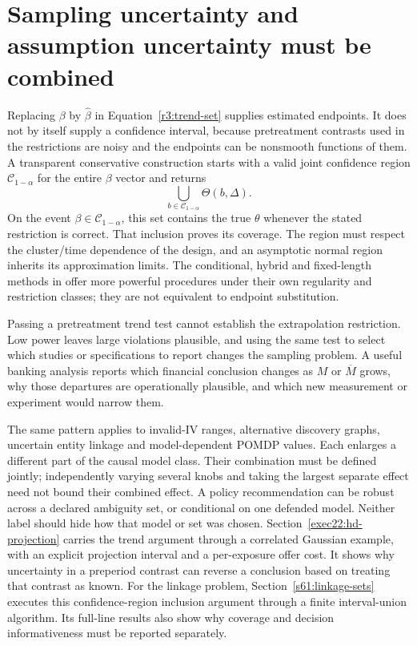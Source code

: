 \section{Sampling uncertainty and assumption uncertainty must be combined}
\label{r3:sensitivity-inference}
Replacing $\beta$ by $\widehat\beta$ in
Equation~\eqref{r3:trend-set} supplies estimated endpoints. It does
not by itself supply a confidence interval, because pretreatment
contrasts used in the restrictions are noisy and the endpoints can
be nonsmooth functions of them. A transparent conservative
construction starts with a valid joint confidence region
$\mathcal C_{1-\alpha}$ for the entire $\beta$ vector and returns
\[
 \bigcup_{b\in\mathcal C_{1-\alpha}}\Theta(b,\Delta).
\]
On the event $\beta\in\mathcal C_{1-\alpha}$, this set contains
the true $\theta$ whenever the stated restriction is correct.
That inclusion proves its coverage. The region must respect the
cluster/time dependence of the design, and an asymptotic normal
region inherits its approximation limits. The conditional,
hybrid and fixed-length methods in
\citet[Sections 3--4]{rambachan2023} offer more powerful procedures
under their own regularity and restriction classes; they are not
equivalent to endpoint substitution.

Passing a pretreatment trend test cannot establish the extrapolation
restriction. Low power leaves large violations plausible, and using
the same test to select which studies or specifications to report
changes the sampling problem. A useful banking analysis reports
which financial conclusion changes as $M$ or $\overline M$ grows,
why those departures are operationally plausible, and which new
measurement or experiment would narrow them.

The same pattern applies to invalid-IV ranges, alternative discovery
graphs, uncertain entity linkage and model-dependent POMDP values.
Each enlarges a different part of the causal model class. Their
combination must be defined jointly; independently varying several
knobs and taking the largest separate effect need not bound their
combined effect. A policy recommendation can be robust across a
declared ambiguity set, or conditional on one defended model. Neither
label should hide how that model or set was chosen.
Section~\ref{exec22:hd-projection} carries the trend argument through a
correlated Gaussian example, with an explicit projection interval and a
per-exposure offer cost. It shows why uncertainty in a preperiod contrast
can reverse a conclusion based on treating that contrast as known.
For the linkage problem, Section~\ref{s61:linkage-sets} executes this
confidence-region inclusion argument through a finite interval-union
algorithm. Its full-line results also show why coverage and decision
informativeness must be reported separately.

